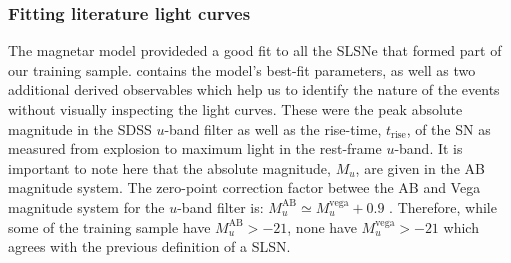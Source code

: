 \subsubsection{Fitting literature light curves}
The magnetar model provideded a good fit to all the SLSNe that formed part of our training sample.  contains the model's best-fit parameters, as well as two additional derived observables which help us to identify the nature of the events without visually inspecting the light curves. These were the peak absolute magnitude in the SDSS $u$-band filter as well as the rise-time, $t_\mathrm{rise}$, of the SN as measured from explosion to maximum light in the rest-frame $u$-band. It is important to note here that the absolute magnitude, $M_u$, are given in the AB magnitude system. The zero-point correction factor betwee the AB and Vega magnitude system for the $u$-band filter is: $M_u^{\mathrm{AB}}\simeq M_u^{\mathrm{vega}}+0.9$ \citep{2007AJ....133..734B}. Therefore, while some of the training sample have $M_u^{\mathrm{AB}}>-21$, none have $M_u^{\mathrm{vega}}>-21$ which agrees with the previous definition of a SLSN.

